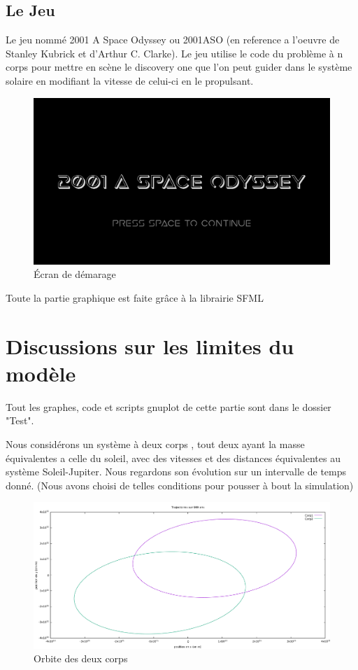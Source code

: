 \documentclass[a4paper]{article}
\begin{document}
\subsection{Le Jeu}
Le jeu nommé 2001 A Space Odyssey ou 2001ASO (en reference a l'oeuvre de Stanley Kubrick et d'Arthur C. Clarke).
Le jeu utilise le code du problème à n corps pour mettre en scène le discovery one que l'on peut guider dans le système solaire en modifiant la vitesse de celui-ci en le propulsant.
\begin{figure}[h]
\centering
\includegraphics[width=.5\textwidth]{ecrandemarage.png}
\caption{Écran de démarage\label{fig:Écran}}
\end{figure}
Toute la partie graphique est faite grâce à la librairie SFML

\newpage

\section{Discussions sur les limites du modèle}
\label{sec:Discussion sur les limites du modèle}

Tout les graphes, code et scripts gnuplot de cette partie sont dans le dossier "Test".
\newline

Nous considérons un système à deux corps , tout deux ayant la masse équivalentes a celle du soleil, avec des vitesses et des distances équivalentes au système Soleil-Jupiter. Nous regardons son évolution  sur un intervalle de temps donné. (Nous avons choisi de telles conditions pour pousser à bout la simulation)

\begin{figure}[h]
\centering
\includegraphics[width=.9\textwidth]{2.png}
\caption{Orbite des deux corps}
\end{figure}
\end{document}
